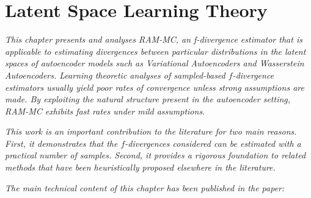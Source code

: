 \chapter{Latent Space Learning Theory}\label{chapter:latent-space-learning-theory}

\ifpdf
    \graphicspath{{Chapter5/Figs/Raster/}{Chapter5/Figs/PDF/}{Chapter5/Figs/}}
\else
    \graphicspath{{Chapter5/Figs/Vector/}{Chapter5/Figs/}}
\fi

\emph{This chapter presents and analyses RAM-MC, an f-divergence estimator that is applicable to estimating divergences between particular distributions in the latent spaces of autoencoder models such as Variational Autoencoders and Wasserstein Autoencoders. 
Learning theoretic analyses of sampled-based $f$-divergence estimators usually yield poor rates of convergence unless strong assumptions are made.
By exploiting the natural structure present in the autoencoder setting, RAM-MC exhibits fast rates under mild assumptions.}

\emph{This work is an important contribution to the literature for two main reasons. 
First, it demonstrates that the $f$-divergences considered can be estimated with a practical number of samples.
Second, it provides a rigorous foundation to related methods that have been heuristically proposed elsewhere in the literature.}

\emph{The main technical content of this chapter has been published in the paper:}

\begin{quote}
\end{quote}

%
%
%
%

